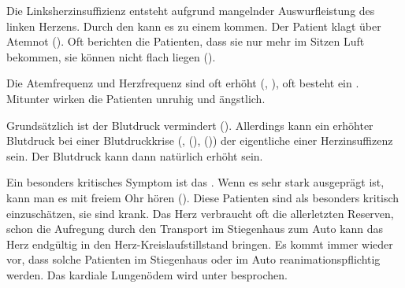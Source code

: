 % 
% 

{\label{topic:linksherzinsuffizienz}%
%
%
%
%
%
Die Linksherzinsuffizienz entsteht aufgrund mangelnder
Auswurfleistung des linken Herzens. Durch den  kann es zu einem
 kommen.
Der Patient klagt über Atemnot (). Oft berichten
die Patienten, dass sie nur mehr im Sitzen Luft bekommen,
sie können nicht flach liegen
().

Die Atemfrequenz und Herzfrequenz sind oft erhöht
(,
), oft besteht ein .
Mitunter wirken die Patienten unruhig und ängstlich.

Grundsätzlich ist der Blutdruck vermindert ().
Allerdings kann ein erhöhter Blutdruck bei einer
Blutdruckkrise (, 
(),  ()) der
eigentliche  einer Herzinsuffizenz sein. Der
Blutdruck
kann dann natürlich erhöht sein. 

Ein besonders kritisches Symptom ist das .
Wenn es sehr stark ausgeprägt ist, kann man es mit freiem
Ohr hören (). Diese
Patienten sind als besonders kritisch einzuschätzen, sie sind
 krank. Das Herz verbraucht oft die
allerletzten Reserven, schon die Aufregung durch den
Transport im Stiegenhaus zum Auto kann das Herz endgültig in
den Herz-Kreislaufstillstand bringen. Es kommt immer wieder
vor, dass solche Patienten im Stiegenhaus oder im Auto reanimationspflichtig werden. 
Das kardiale Lungenödem wird unter
besprochen.

}
